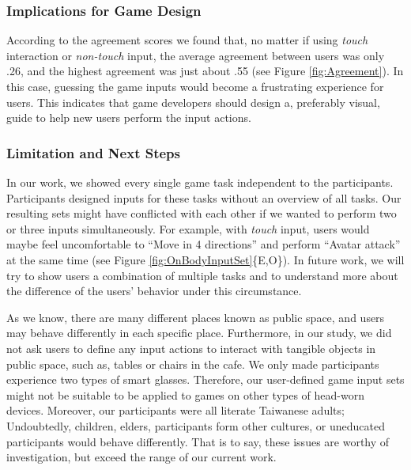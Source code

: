 \documentclass{sigchi}
\begin{document}
  \subsubsection{Implications for Game Design}
  According to the agreement scores we found that, no matter if using \emph{touch} interaction or \emph{non-touch} input, the average agreement between users was only .26, and the highest agreement was just about .55 (see Figure \ref{fig:Agreement}). In this case, guessing the game inputs would become a frustrating experience for users. This indicates that game developers should design a, preferably visual, guide to help new users perform the input actions.




  \subsubsection{Limitation and Next Steps}

  In our work, we showed every single game task independent to the participants. Participants designed inputs for these tasks without an overview of all tasks. Our resulting sets might have conflicted with each other if we wanted to perform two or three inputs simultaneously. For example, with \emph{touch} input, users would maybe feel uncomfortable to ``Move in 4 directions'' and perform ``Avatar attack'' at the same time (see Figure \ref{fig:OnBodyInputSet}\{E,O\}). In future work, we will try to show users a combination of multiple tasks and to understand more about the difference of the users' behavior under this circumstance.

  As we know, there are many different places known as public space, and users may behave differently in each specific place. Furthermore, in our study, we did not ask users to define any input actions to interact with tangible objects in public space, such as, tables or chairs in the cafe. We only made participants experience two types of smart glasses. Therefore, our user-defined game input sets might not be suitable to be applied to games on other types of head-worn devices. Moreover, our participants were all literate Taiwanese adults; Undoubtedly, children, elders, participants form other cultures, or uneducated participants would behave differently. That is to say, these issues are worthy of investigation, but exceed the range of our current work.
\end{document}
